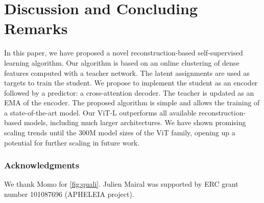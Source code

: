 \section{Discussion and Concluding Remarks}
In this paper, we have proposed a novel reconstruction-based self-supervised learning algorithm.
Our algorithm is based on an online clustering of dense features computed with a teacher network.
The latent assignments are used as targets to train the student.
We propose to implement the student as an encoder followed by a predictor: a cross-attention decoder.
The teacher is updated as an EMA of the encoder.
The proposed algorithm is simple and allows the training of a state-of-the-art model.
Our ViT-L outperforms all available reconstruction-based models, including much larger architectures.
We have shown promising scaling trends until the 300M model sizes of the ViT family, opening up a potential for further scaling in future work.

\subsubsection*{Acknowledgments}
We thank Momo for \cref{fig:quali}.
Julien Mairal was supported by ERC grant number 101087696 (APHELEIA project).
